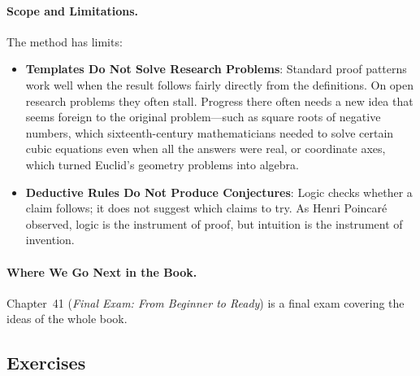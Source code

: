 \paragraph{Scope and Limitations.}
The method has limits:
\begin{itemize}
  \item \textbf{Templates Do Not Solve Research Problems}: Standard proof patterns work well when the result follows fairly directly from the definitions. On open research problems they often stall. Progress there often needs a new idea that seems foreign to the original problem---such as square roots of negative numbers, which sixteenth-century mathematicians needed to solve certain cubic equations even when all the answers were real, or coordinate axes, which turned Euclid's geometry problems into algebra.
  \item \textbf{Deductive Rules Do Not Produce Conjectures}: Logic checks whether a claim follows; it does not suggest which claims to try. As Henri Poincar\'e observed, logic is the instrument of proof, but intuition is the instrument of invention.
\end{itemize}

\paragraph{Where We Go Next in the Book.}
Chapter~41 (\emph{Final Exam: From Beginner to Ready}) is a final exam covering the ideas of the whole book.

\subsection{Exercises}

